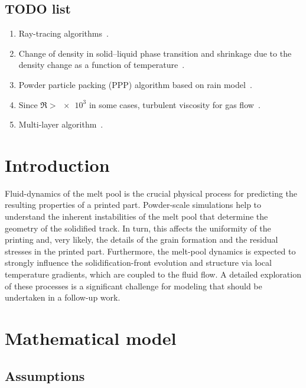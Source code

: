 \documentclass{article}
\begin{document}
\subsection{TODO list}
\begin{enumerate}
    \item Ray-tracing algorithms~\cite{cook2019simulation}.
    \item Change of density in solid--liquid phase transition and shrinkage due to the density change as a function of temperature~\cite{wei2017thermal}.
    \item Powder particle packing (PPP) algorithm based on rain model~\cite{attar2011simulation}.
    \item Since $\Re>\num{e3}$ in some cases, turbulent viscosity for gas flow~\cite{zhirnov2018evaporation,gusarov2020entrainment,matthews2016denudation}.
    \item Multi-layer algorithm~\cite{attar2011simulation}.
\end{enumerate}

\section{Introduction}

Fluid-dynamics of the melt pool is the crucial physical process
for predicting the resulting properties of a printed part.
Powder-scale simulations help to understand the inherent instabilities of the melt pool
that determine the geometry of the solidified track.
In turn, this affects the uniformity of the printing and, very likely, the details of the grain formation
and the residual stresses in the printed part.
Furthermore, the melt-pool dynamics is expected to strongly influence the solidification-front evolution
and structure via local temperature gradients, which are coupled to the fluid flow.
A detailed exploration of these processes is a significant challenge for modeling
that should be undertaken in a follow-up work.

\section{Mathematical model}

\subsection{Assumptions}
\end{document}
